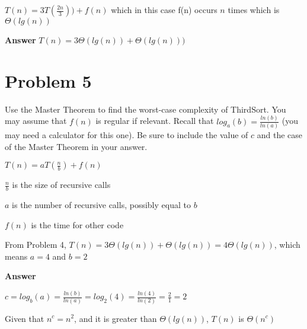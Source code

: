 \documentclass[12pt, letterpaper]{article}
\begin{document}
$T(n) = 3T(\frac{2n}{3})) + f(n)$ which in this case f(n) occurs $n$ times which is $\Theta(lg(n))$

\textbf{Answer} $T(n) = 3\Theta(lg(n)) + \Theta(lg(n)))$

\section*{Problem 5}

Use the Master Theorem to find the worst-case complexity of ThirdSort.  You may assume that $f(n)$ is
regular if relevant.  Recall that $log_a(b) = \frac{ln(b)}{ln(a)}$ (you may need a calculator for this one).
Be sure to include the value of $c$ and the case of the Master Theorem in your answer.

\noindent
$T(n) = aT(\frac{n}{b}) + f(n)$

\noindent
$\frac{n}{b}$ is the size of recursive calls

\noindent
$a$ is the  number of recursive calls, possibly equal to $b$ 

\noindent
$f(n)$ is the time for other code

\noindent
From Problem 4, $T(n) = 3\Theta(lg(n)) + \Theta(lg(n)) = 4\Theta(lg(n))$, which means $a = 4$ and $b = 2$

\noindent
\textbf{Answer} 

\noindent
$c = log_b(a) = \frac{ln(b)}{ln(a)} = log_2(4) = \frac{ln(4)}{ln(2)} = \frac{2}{1} = 2$

\noindent
Given that $n^c = n^2$, and it is greater than $\Theta(lg(n))$, $T(n)$ is $\Theta(n^c)$
\end{document}
